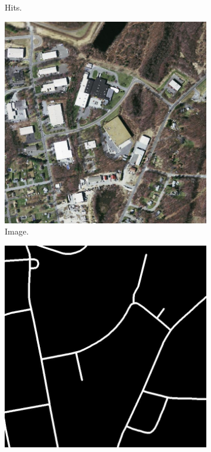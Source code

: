 \begin{figure}[H]
\begin{subfigure}{0.23\textwidth}
\caption{ Hits. }
\vspace{0.2cm} %
\end{subfigure}
\begin{subfigure}{0.23\textwidth}
\includegraphics[width=\textwidth]{figs/appendix/img11728825_15.jpg}
\caption{ Image.}
\vspace{0.2cm} %
\end{subfigure}
\hspace*{\fill} %
\begin{subfigure}{0.23\textwidth}
\includegraphics[width=\textwidth]{figs/appendix/label11728825_15.jpg}

\end{subfigure}
\end{figure}
